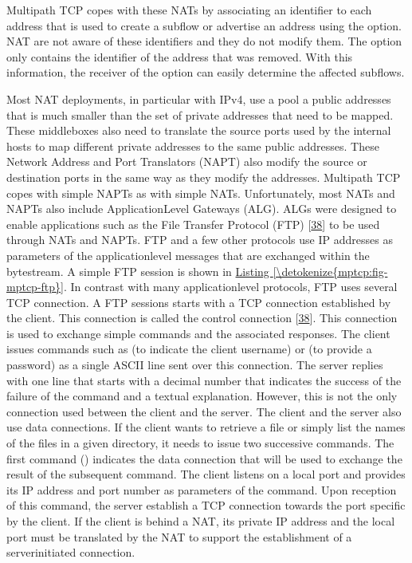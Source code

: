 \documentclass[letterpaper,10pt,english]{sphinxmanual}
\begin{document}
\sphinxAtStartPar
Multipath TCP copes with these NATs by associating an identifier to each address that is used to create a subflow or advertise an address using the  option. NAT are not aware of these identifiers and they do not modify them. The  option only contains the identifier of the address that was removed. With this information, the receiver of the option can easily determine the affected subflows.

\sphinxAtStartPar
Most NAT deployments, in particular with IPv4, use a pool a public addresses that is much smaller than the set of private addresses that need to be mapped. These middleboxes also need to translate the source ports used by the internal hosts to map different private addresses to the same public addresses. These Network Address and Port Translators (NAPT) also modify the source or destination ports in the same way as they modify the addresses. Multipath TCP copes with simple NAPTs as with simple NATs. Unfortunately, most NATs and NAPTs also include Application\sphinxhyphen{}Level Gateways (ALG). ALGs were designed to enable applications such as the File Transfer Protocol (FTP) {[}\hyperlink{cite.biblio:id894}{38}{]} to be used through NATs and NAPTs. FTP and a few other protocols use IP addresses as parameters of the application\sphinxhyphen{}level messages that are exchanged within the bytestream. A simple FTP session is shown in \hyperref[\detokenize{mptcp:fig-mptcp-ftp}]{Listing \ref{\detokenize{mptcp:fig-mptcp-ftp}}}. In contrast with many application\sphinxhyphen{}level protocols, FTP uses several TCP connection. A FTP sessions starts with a TCP connection established by the client. This connection is called the control connection {[}\hyperlink{cite.biblio:id894}{38}{]}. This connection is used to exchange simple commands and the associated responses. The client issues commands such as  (to indicate the client username) or  (to provide a password) as a single ASCII line sent over this connection. The server replies with one line that starts with a decimal number that indicates the success of the failure of the command and a textual explanation. However, this is not the only connection used between the client and the server. The client and the server also use data connections. If the client wants to retrieve a file or simply list the names of the files in a given directory, it needs to issue two successive commands. The first command () indicates the data connection that will be used to exchange the result of the subsequent command. The client listens on a local port and provides its IP address and port number as parameters of the  command. Upon reception of this command, the server establish a TCP connection towards the port specific by the client. If the client is behind a NAT, its private IP address and the local port must be translated by the NAT to support the establishment of a server\sphinxhyphen{}initiated connection.
\end{document}
